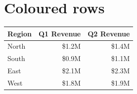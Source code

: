 \documentclass{article}
\begin{document}
\section{Coloured rows}

\begin{tabular}{|l|r|r|}
  \hline
  \rowcolor{headerBg}
  Region & Q1 Revenue & Q2 Revenue \\
  \hline
  North & \$1.2M & \$1.4M \\
  \rowcolor{gray!15}
  South & \$0.9M & \$1.1M \\
  East  & \$2.1M & \$2.3M \\
  \rowcolor{gray!15}
  West  & \$1.8M & \$1.9M \\
  \hline
\end{tabular}
\end{document}
